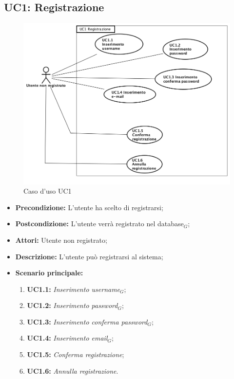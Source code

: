 \newpage
\subsection{ UC1: Registrazione}

\begin{figure}[h]
	\begin{center}
	\includegraphics[scale=0.5]{diagram/UC1.png}
	\caption{Caso d'uso UC1}
	\end{center}
\end{figure}
\begin{itemize}
	\item \textbf{Precondizione:} L'utente ha scelto di registrarsi;
	\item \textbf{Postcondizione:} L'utente verrà registrato nel database$_G$;
	\item \textbf{Attori:} Utente non registrato;
	\item \textbf{Descrizione:} L'utente può registrarsi al sistema;
	\item \textbf{Scenario principale:}
	\begin{enumerate}
		\item \textbf{ UC1.1:} \textit{ Inserimento username$_G$};
		\item \textbf{ UC1.2:} \textit{ Inserimento password$_G$};
		\item \textbf{ UC1.3:} \textit{ Inserimento conferma password$_G$};
		\item \textbf{ UC1.4:} \textit{ Inserimento email$_G$};
		\item \textbf{ UC1.5:} \textit{ Conferma registrazione};
		\item \textbf{ UC1.6:} \textit{ Annulla registrazione}.
	\end{enumerate}
\end{itemize}
